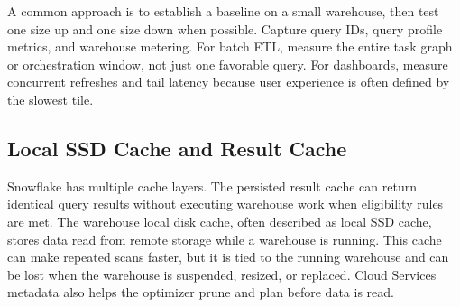 A common approach is to establish a baseline on a small warehouse, then test one size up and one size down when possible. Capture query IDs, query profile metrics, and warehouse metering. For batch ETL, measure the entire task graph or orchestration window, not just one favorable query. For dashboards, measure concurrent refreshes and tail latency because user experience is often defined by the slowest tile.

\subsection{Local SSD Cache and Result Cache}
Snowflake has multiple cache layers. The persisted result cache can return identical query results without executing warehouse work when eligibility rules are met. The warehouse local disk cache, often described as local SSD cache, stores data read from remote storage while a warehouse is running. This cache can make repeated scans faster, but it is tied to the running warehouse and can be lost when the warehouse is suspended, resized, or replaced. Cloud Services metadata also helps the optimizer prune and plan before data is read.

